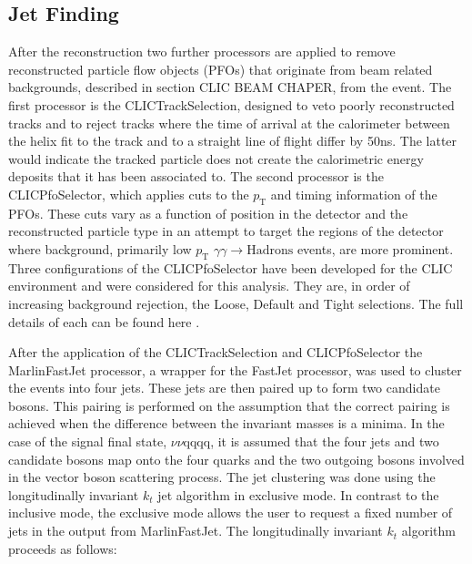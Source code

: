 \subsection{Jet Finding} 
\label{sec:jetpairing}
After the reconstruction two further processors are applied to remove reconstructed particle flow objects (PFOs) that originate from beam related backgrounds, described in section CLIC BEAM CHAPER, from the event.  The first processor is the CLICTrackSelection, designed to veto poorly reconstructed tracks and to reject tracks where the time of arrival at the calorimeter between the helix fit to the track and to a straight line of flight differ by 50ns.  The latter would indicate the tracked particle does not create the calorimetric energy deposits that it has been associated to.  The second processor is the CLICPfoSelector, which applies cuts to the $p_{\text{T}}$ and timing information of the PFOs.  These cuts vary as a function of position in the detector and the reconstructed particle type in an attempt to target the regions of the detector where background, primarily low $p_{\text{T}}$ $\gamma\gamma \rightarrow \text{Hadrons}$ events, are more prominent.  Three configurations of the CLICPfoSelector have been developed for the CLIC environment and were considered for this analysis.  They are, in order of increasing background rejection, the Loose, Default and Tight selections. The full details of each can be found here \cite{arXiv:1209.4039}.

After the application of the CLICTrackSelection and CLICPfoSelector the MarlinFastJet processor, a wrapper for the FastJet \cite{Cacciari:2011ma} processor, was used to cluster the events into four jets.  These jets are then paired up to form two candidate bosons.  This pairing is performed on the assumption that the correct pairing is achieved when the difference between the invariant masses is a minima.  In the case of the signal final state, $\nu\nu$qqqq, it is assumed that the four jets and two candidate bosons map onto the four quarks and the two outgoing bosons involved in the vector boson scattering process.  The jet clustering was done using the longitudinally invariant $k_{t}$ jet algorithm in exclusive mode.  In contrast to the inclusive mode, the exclusive mode allows the user to request a fixed number of jets in the output from MarlinFastJet.  The longitudinally invariant $k_{t}$ algorithm proceeds as follows:

